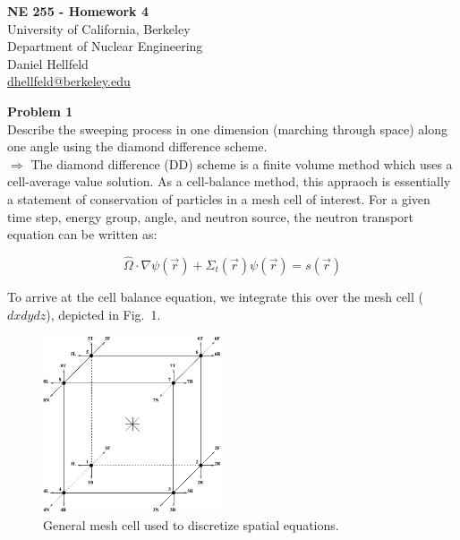 \documentclass[10pt]{article}
\begin{document}
\begin{centering}
\textbf{\large NE 255 - Homework 4}\\
\vspace{10pt}
University of California, Berkeley\\
Department of Nuclear Engineering\\
\vspace{10pt}
Daniel Hellfeld\\
\href{mailto:dhellfeld@berkeley.edu}{dhellfeld@berkeley.edu}\\
\end{centering}






\vspace{20pt}
\noindent \textbf{Problem 1}\\
Describe the sweeping process in one dimension (marching through space) along one angle using the diamond difference scheme.\\

$\Rightarrow$ The diamond difference (DD) scheme is a finite volume method which uses a cell-average value solution. As a cell-balance method, this appraoch is essentially a statement of conservation of particles in a mesh cell of interest. For a given time step, energy group, angle, and neutron source, the neutron transport equation can be written as:

\begin{equation*}
        \hat{\Omega} \cdot \nabla \psi(\vec{r}) + \Sigma_t(\vec{r})\psi(\vec{r}) = s(\vec{r})
\end{equation*}

To arrive at the cell balance equation, we integrate this over the mesh cell ($dxdydz$), depicted in Fig.~1.

\begin{figure}[htb]
    \centering
    \includegraphics[width=150pt]{Figures/mesh_cell_sn}
    \caption{General mesh cell used to discretize spatial equations.}
    \label{cellmesh}
\end{figure}
\end{document}
